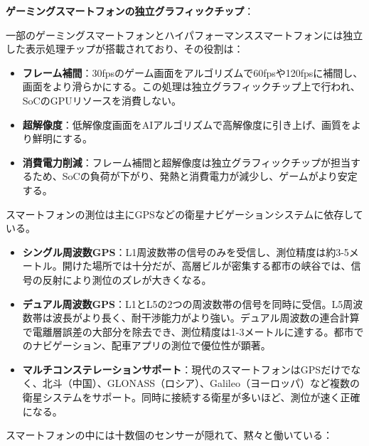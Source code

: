 \textbf{ゲーミングスマートフォンの独立グラフィックチップ}：

一部のゲーミングスマートフォンとハイパフォーマンススマートフォンには独立した表示処理チップが搭載されており、その役割は：

\begin{itemize}
  \item \textbf{フレーム補間}：30fpsのゲーム画面をアルゴリズムで60fpsや120fpsに補間し、画面をより滑らかにする。この処理は独立グラフィックチップ上で行われ、SoCのGPUリソースを消費しない。
  \item \textbf{超解像度}：低解像度画面をAIアルゴリズムで高解像度に引き上げ、画質をより鮮明にする。
  \item \textbf{消費電力削減}：フレーム補間と超解像度は独立グラフィックチップが担当するため、SoCの負荷が下がり、発熱と消費電力が減少し、ゲームがより安定する。
\end{itemize}


スマートフォンの測位は主にGPSなどの衛星ナビゲーションシステムに依存している。

\begin{itemize}
  \item \textbf{シングル周波数GPS}：L1周波数帯の信号のみを受信し、測位精度は約3-5メートル。開けた場所では十分だが、高層ビルが密集する都市の峡谷では、信号の反射により測位のズレが大きくなる。
  \item \textbf{デュアル周波数GPS}：L1とL5の2つの周波数帯の信号を同時に受信。L5周波数帯は波長がより長く、耐干渉能力がより強い。デュアル周波数の連合計算で電離層誤差の大部分を除去でき、測位精度は1-3メートルに達する。都市でのナビゲーション、配車アプリの測位で優位性が顕著。
  \item \textbf{マルチコンステレーションサポート}：現代のスマートフォンはGPSだけでなく、北斗（中国）、GLONASS（ロシア）、Galileo（ヨーロッパ）など複数の衛星システムをサポート。同時に接続する衛星が多いほど、測位が速く正確になる。
\end{itemize}


スマートフォンの中には十数個のセンサーが隠れて、黙々と働いている：


